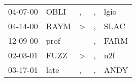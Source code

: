 \begin{supertabular}{p{0.07\textwidth}p{0.06\textwidth}p{0.02\textwidth}p{0.02\textwidth}p{0.06\textwidth}}
 04-07-00\textsuperscript{} &  OBLI\textsuperscript{} &             , &  , &  lgio\textsuperscript{} \\
 04-14-00\textsuperscript{} &  RAYM\textsuperscript{} &  \textgreater &  , &  SLAC\textsuperscript{} \\
 12-09-00\textsuperscript{} &  prof\textsuperscript{} &               &  , &  FARM\textsuperscript{} \\
 02-03-01\textsuperscript{} &  FUZZ\textsuperscript{} &  \textgreater &  , &   n2f\textsuperscript{} \\
 03-17-01\textsuperscript{} &  late\textsuperscript{} &             , &  , &  ANDY\textsuperscript{} \\
\end{supertabular}
